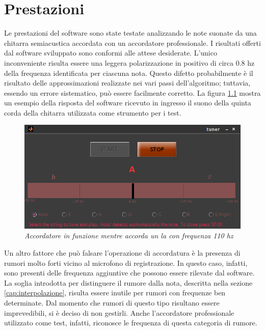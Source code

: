 \chapter{Prestazioni}\label{cap:prestazioni}

Le prestazioni del software sono state testate analizzando le note suonate da una chitarra semiacustica accordata con un accordatore professionale.
I risultati offerti dal software sviluppato sono conformi alle attese desiderate.
L'unico inconveniente risulta essere una leggera polarizzazione in positivo di circa 0.8 hz della frequenza identificata per ciascuna nota.
Questo difetto probabilmente è il risultato delle approssimazioni realizzate nei vari passi dell'algoritmo; tuttavia, essendo un errore sistematico, può essere facilmente corretto.
La figura \ref{fig:accordatore_in_funzione} mostra un esempio della risposta del software ricevuto in ingresso il suono della quinta corda della chitarra utilizzata come strumento per i test. 

\begin{figure}[h]
  \begin{center} 
    \includegraphics[width=\textwidth*\real{0.8}]{images/ch_08/prestazioni.png}
  \end{center} 
  \caption{\textit{Accordatore in funzione mentre accorda un la con frequenza 110 hz}}  
  \label{fig:accordatore_in_funzione}
\end{figure}

Un altro fattore che può falsare l'operazione di accordatura è la presenza di rumori molto forti vicino al microfono di registrazione. 
In questo caso, infatti, sono presenti delle frequenza aggiuntive che possono essere rilevate dal software.
La soglia introdotta per distinguere il rumore dalla nota, descritta nella sezione \ref{cap:interpolazione}, risulta essere inutile per rumori con frequenze ben determinate. 
Dal momento che rumori di questo tipo risultano essere imprevedibili, si è deciso di non gestirli.
Anche l'accordatore professionale utilizzato come test, infatti, riconosce le frequenza di questa categoria di rumore.
 
